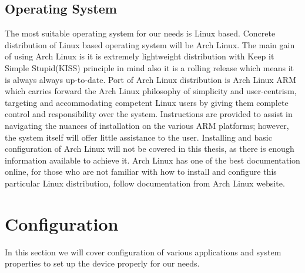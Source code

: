 \subsection{Operating System}
The most suitable operating system for our needs is Linux based. Concrete distribution of Linux based operating system will be Arch Linux. The main gain of using Arch Linux is it is extremely lightweight distribution with Keep it Simple Stupid(KISS) principle in mind also it is a rolling release which means it is always always up-to-date. Port of Arch Linux distribution is Arch Linux ARM which carries forward the Arch Linux philosophy of simplicity and user-centrism, targeting and accommodating competent Linux users by giving them complete control and responsibility over the system. Instructions are provided to assist in navigating the nuances of installation on the various ARM platforms; however, the system itself will offer little assistance to the user.
Installing and basic configuration of Arch Linux will not be covered in this thesis, as there is enough information available to achieve it. Arch Linux has one of the best documentation online, for those who are not familiar with how to install and configure this particular Linux distribution, follow documentation from Arch Linux website.

\newpage
\section{Configuration} %
\label{sec:configuration}
In this section we will cover configuration of various applications and system properties to set up the device properly for our needs.
